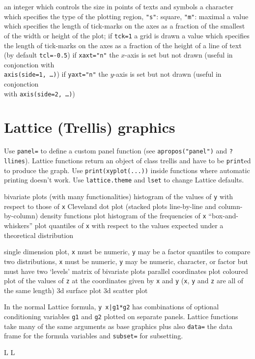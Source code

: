 	{ an integer which controls the size in points of texts and symbols}
	{ a character which specifies the type of the plotting region, {\tt "s"}: square, {\tt "m"}: maximal}
	{a value which specifies the length of tick-marks on the axes as a fraction of the smallest of the width or height of the plot; if {\tt tck=1} a grid is drawn}
	{ a value which specifies the length of tick-marks on the axes as a fraction of the height of a line of text (by default {\tt tcl=-0.5})}
	{if {\tt xaxt="n"} the $x$-axis is set but not drawn (useful in
    conjonction with\\
    {\tt axis(side=1, \ldots)})}
	{if {\tt yaxt="n"} the $y$-axis is set but not drawn (useful in conjonction \\with {\tt axis(side=2, \ldots)})}

\section{Lattice (Trellis) graphics}{ Use {\tt panel=} to define a custom panel
    function (see {\tt apropos("panel")} and {\tt ?llines}). Lattice functions
    return an object of class trellis and have to be {\tt print}ed to produce
    the graph. Use {\tt print(xyplot(...))} inside functions where automatic
    printing doesn't work. Use {\tt lattice.theme} and {\tt lset} to change
    Lattice defaults.}

	{ bivariate plots (with many functionalities)}
	{  histogram of the values of {\tt y} with respect to those of {\tt x}}
	{ Cleveland dot plot (stacked plots line-by-line and column-by-column)}
	{ density functions plot}
	{ histogram of the frequencies of {\tt x}}
	{ ``box-and-whiskers'' plot}
	{  quantiles of {\tt x} with respect to the values expected under a theoretical distribution}

	{  single dimension plot, {\tt x} must be numeric, {\tt y} may be a factor}
	{quantiles to compare two distributions, {\tt x} must be numeric, {\tt y} may be numeric, character, or factor but must have two `levels'}
	{ matrix of bivariate plots}
	{ parallel coordinates plot}
	{coloured plot of the values of {\tt z} at the coordinates given by {\tt x} and {\tt y} ({\tt x}, {\tt y} and {\tt z} are all of the same length)}
	{ 3d surface plot}
	{ 3d scatter plot}

In the normal Lattice formula, {\tt y~x|g1*g2} has
combinations of optional conditioning variables {\tt g1} and {\tt g2} plotted
on separate panels. Lattice functions take many of the same arguments as base
graphics plus also {\tt data=} the data frame for the formula variables and
{\tt subset=} for subsetting.



\copyrightnotice

\supereject
\if L\lr \else\null\vfill\eject\fi
\if L\lr \else\null\vfill\eject\fi
\bye

